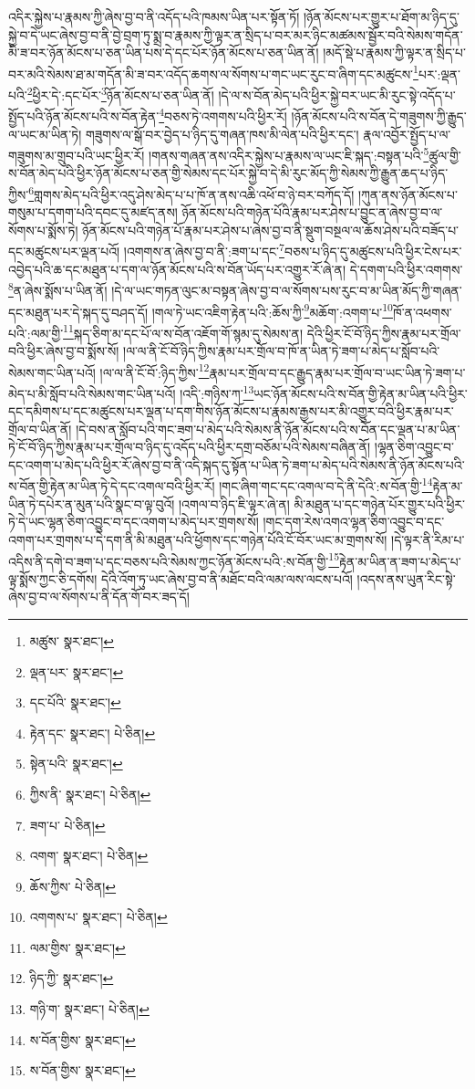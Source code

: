 འདིར་སྐྱེས་པ་རྣམས་ཀྱི་ཞེས་བྱ་བ་ནི་འདོད་པའི་ཁམས་ཡིན་པར་སྟོན་ཏོ། །ཉོན་མོངས་པར་གྱུར་པ་ཐོག་མ་ཉིད་དུ་སྐྱེ་བ་དེ་ཡང་ཞེས་བྱ་བ་ནི་བྱེ་བྲག་ཏུ་སྨྲ་བ་རྣམས་ཀྱི་ལྟར་ན་སྲིད་པ་བར་མར་ཉིང་མཚམས་སྦྱོར་བའི་སེམས་གདོན་མི་ཟ་བར་ཉོན་མོངས་པ་ཅན་ཡིན་པས་དེ་དང་པོར་ཉོན་མོངས་པ་ཅན་ཡིན་ནོ། །མདོ་སྡེ་པ་རྣམས་ཀྱི་ལྟར་ན་སྲིད་པ་བར་མའི་སེམས་ཐ་མ་གདོན་མི་ཟ་བར་འདོད་ཆགས་ལ་སོགས་པ་གང་ཡང་རུང་བ་ཞིག་དང་མཚུངས་\footnote{མཚུས་  སྣར་ཐང་། }པར་:ལྡན་པའི་\footnote{ལྡན་པར་  སྣར་ཐང་། }ཕྱིར་དེ་:དང་པོར་\footnote{དང་པོའི་  སྣར་ཐང་། }ཉོན་མོངས་པ་ཅན་ཡིན་ནོ། །དེ་ལ་ས་བོན་མེད་པའི་ཕྱིར་སྐྱེ་བར་ཡང་མི་རུང་སྟེ་འདོད་པ་སྤྱོད་པའི་ཉོན་མོངས་པའི་ས་བོན་རྟེན་\footnote{རྟེན་དང་  སྣར་ཐང་།  པེ་ཅིན། }བཅས་ཏེ་འགགས་པའི་ཕྱིར་རོ། །ཉོན་མོངས་པའི་ས་བོན་དེ་གཟུགས་ཀྱི་རྒྱུད་ལ་ཡང་མ་ཡིན་ཏེ། གཟུགས་ལ་སྒོ་བར་བྱེད་པ་ཉིད་དུ་གཞན་ཁས་མི་ལེན་པའི་ཕྱིར་དང་། རྣལ་འབྱོར་སྤྱོད་པ་ལ་གཟུགས་མ་གྲུབ་པའི་ཡང་ཕྱིར་རོ། །གནས་གཞན་ནས་འདིར་སྐྱེས་པ་རྣམས་ལ་ཡང་ཇི་སྐད་:བསྟན་པའི་\footnote{སྟེན་པའི་  སྣར་ཐང་། }ཚུལ་གྱི་ས་བོན་མེད་པའི་ཕྱིར་ཉོན་མོངས་པ་ཅན་གྱི་སེམས་དང་པོར་སྐྱེ་བ་དེ་མི་རུང་མོད་ཀྱི་སེམས་ཀྱི་རྒྱུན་ཆད་པ་ཉིད་ཀྱིས་\footnote{ཀྱིས་ནི་  སྣར་ཐང་།  པེ་ཅིན། }གླགས་མེད་པའི་ཕྱིར་འདུ་ཤེས་མེད་པ་པ་ཁོ་ན་ནས་འཆི་འཕོ་བ་ཉེ་བར་བཀོད་དོ། །ཀུན་ནས་ཉོན་མོངས་པ་གསུམ་པ་དགག་པའི་དབང་དུ་མཛད་ནས། ཉོན་མོངས་པའི་གཉེན་པོའི་རྣམ་པར་ཤེས་པ་བྱུང་ན་ཞེས་བྱ་བ་ལ་སོགས་པ་སྨོས་ཏེ། ཉོན་མོངས་པའི་གཉེན་པོ་རྣམ་པར་ཤེས་པ་ཞེས་བྱ་བ་ནི་སྡུག་བསྔལ་ལ་ཆོས་ཤེས་པའི་བཟོད་པ་དང་མཚུངས་པར་ལྡན་པའོ། །འགགས་ན་ཞེས་བྱ་བ་ནི་:ཟག་པ་དང་\footnote{ཟག་པ་  པེ་ཅིན། }བཅས་པ་ཉིད་དུ་མཚུངས་པའི་ཕྱིར་ངེས་པར་འབྱེད་པའི་ཆ་དང་མཐུན་པ་དག་ལ་ཉོན་མོངས་པའི་ས་བོན་ཡོད་པར་འགྱུར་རོ་ཞེ་ན། དེ་དགག་པའི་ཕྱིར་འགགས་\footnote{འགག་  སྣར་ཐང་།  པེ་ཅིན། }ན་ཞེས་སྨོས་པ་ཡིན་ནོ། །དེ་ལ་ཡང་གཏན་ལུང་མ་བསྟན་ཞེས་བྱ་བ་ལ་སོགས་པས་རུང་བ་མ་ཡིན་མོད་ཀྱི་གཞན་དང་མཐུན་པར་དེ་སྐད་དུ་བཤད་དོ། །གལ་ཏེ་ཡང་འཇིག་རྟེན་པའི་:ཆོས་ཀྱི་\footnote{ཆོས་ཀྱིས་  པེ་ཅིན། }མཆོག་:འགག་པ་\footnote{འགགས་པ་  སྣར་ཐང་།  པེ་ཅིན། }ཁོ་ན་འཕགས་པའི་:ལམ་གྱི་\footnote{ལམ་གྱིས་  སྣར་ཐང་། }སྐད་ཅིག་མ་དང་པོ་ལ་ས་བོན་འཇོག་གོ་སྙམ་དུ་སེམས་ན། དེའི་ཕྱིར་ངོ་བོ་ཉིད་ཀྱིས་རྣམ་པར་གྲོལ་བའི་ཕྱིར་ཞེས་བྱ་བ་སྨོས་སོ། །ལ་ལ་ནི་ངོ་བོ་ཉིད་ཀྱིས་རྣམ་པར་གྲོལ་བ་ཁོ་ན་ཡིན་ཏེ་ཟག་པ་མེད་པ་སློབ་པའི་སེམས་གང་ཡིན་པའོ། །ལ་ལ་ནི་ངོ་བོ་:ཉིད་ཀྱིས་\footnote{ཉིད་ཀྱི་  སྣར་ཐང་། }རྣམ་པར་གྲོལ་བ་དང་རྒྱུད་རྣམ་པར་གྲོལ་བ་ཡང་ཡིན་ཏེ་ཟག་པ་མེད་པ་མི་སློབ་པའི་སེམས་གང་ཡིན་པའོ། །འདི་:གཉིས་ཀ་\footnote{གཉི་ག་  སྣར་ཐང་།  པེ་ཅིན། }ཡང་ཉོན་མོངས་པའི་ས་བོན་གྱི་རྟེན་མ་ཡིན་པའི་ཕྱིར་དང་དམིགས་པ་དང་མཚུངས་པར་ལྡན་པ་དག་གིས་ཉོན་མོངས་པ་རྣམས་རྒྱས་པར་མི་འགྱུར་བའི་ཕྱིར་རྣམ་པར་གྲོལ་བ་ཡིན་ནོ། །དེ་བས་ན་སློབ་པའི་གང་ཟག་པ་མེད་པའི་སེམས་ནི་ཉོན་མོངས་པའི་ས་བོན་དང་ལྡན་པ་མ་ཡིན་ཏེ་ངོ་བོ་ཉིད་ཀྱིས་རྣམ་པར་གྲོལ་བ་ཉིད་དུ་འདོད་པའི་ཕྱིར་དགྲ་བཅོམ་པའི་སེམས་བཞིན་ནོ། །ལྷན་ཅིག་འབྱུང་བ་དང་འགག་པ་མེད་པའི་ཕྱིར་རོ་ཞེས་བྱ་བ་ནི་འདི་སྐད་དུ་སྟོན་པ་ཡིན་ཏེ་ཟག་པ་མེད་པའི་སེམས་ནི་ཉོན་མོངས་པའི་ས་བོན་གྱི་རྟེན་མ་ཡིན་ཏེ་དེ་དང་འགལ་བའི་ཕྱིར་རོ། །གང་ཞིག་གང་དང་འགལ་བ་དེ་ནི་དེའི་:ས་བོན་གྱི་\footnote{ས་བོན་གྱིས་  སྣར་ཐང་། }རྟེན་མ་ཡིན་ཏེ་དཔེར་ན་མུན་པའི་སྣང་བ་ལྟ་བུའོ། །འགལ་བ་ཉིད་ཇི་ལྟར་ཞེ་ན། མི་མཐུན་པ་དང་གཉེན་པོར་གྱུར་པའི་ཕྱིར་ཏེ་དེ་ཡང་ལྷན་ཅིག་འབྱུང་བ་དང་འགག་པ་མེད་པར་གྲགས་སོ། །གང་དག་རེས་འགའ་ལྷན་ཅིག་འབྱུང་བ་དང་འགག་པར་གྲགས་པ་དེ་དག་ནི་མི་མཐུན་པའི་ཕྱོགས་དང་གཉེན་པོའི་ངོ་བོར་ཡང་མ་གྲགས་སོ། །དེ་ལྟར་ནི་རིམ་པ་འདིས་ནི་དགེ་བ་ཟག་པ་དང་བཅས་པའི་སེམས་ཀྱང་ཉོན་མོངས་པའི་:ས་བོན་གྱི་\footnote{ས་བོན་གྱིས་  སྣར་ཐང་། }རྟེན་མ་ཡིན་ན་ཟག་པ་མེད་པ་ལྟ་སྨོས་ཀྱང་ཅི་དགོས། དེའི་འོག་ཏུ་ཡང་ཞེས་བྱ་བ་ནི་མཐོང་བའི་ལམ་ལས་ལངས་པའོ། །འདས་ནས་ཡུན་རིང་སྟེ་ཞེས་བྱ་བ་ལ་སོགས་པ་ནི་དོན་གོ་བར་ཟད་དོ། 